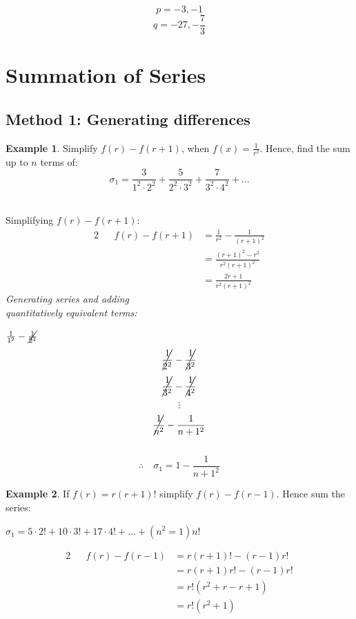 \documentclass[12pt, a4paper]{report}
\theoremstyle{definition}
\newtheorem{example}{Example}
\begin{document}
	\begin{center}
		$$ p = -3,-1 $$
		$$ q= -27, -\dfrac{7}{3}$$
	\end{center}
	\hrulefill
	\newpage
	\section{Summation of Series}
	\subsection{Method 1: Generating differences}
	
	\begin{example}
		Simplify $f(r)-f(r+1)$, when $f(x) = \frac{1}{r^2}$. Hence, find the sum up to $n$ terms of:\\ $$\sigma_1 = \frac{3}{1^2\cdot 2^2} + \frac{5}{2^2\cdot 3^2} + \frac{7}{3^2\cdot 4^2} + \ldots$$
	\end{example}
	~\\
	Simplifying $f(r) - f(r+1)\colon$
	\begin{alignat*}{2}
		&   & f(r)-f(r+1) & = \frac{1}{r^{2}} - \frac{1}{(r+1)^{2}} \\
		&   &             & =\frac{(r+1)^{2}-r^2}{r^2(r+1)^{2}}     \\
		&   &             & =\frac{2r+1}{r^2(r+1)^2}                
	\end{alignat*}
	\textit{Generating series and adding}\\
	\textit{quantitatively equivalent terms:}
	\begin{center}
		$	\frac{1}{1^2} - \cancel{\frac{1}{2^2}}$
		$$	\cancel{\frac{1}{2^2}} - \cancel{\frac{1}{3^2}}$$
		$$	\cancel{\frac{1}{3^2}} - \cancel{\frac{1}{4^2}}$$
		$$\vdots$$
		$$\cancel{\frac{1}{n^2}} - \frac{1}{n+1^2}$$
		~\\
		$$\boxed{\therefore \quad \sigma_1 = 1 - \frac{1}{n+1^2}}$$
	\end{center}
	\hrulefill
	\begin{example}
		If $f(r) = r(r+1)!$ simplify $f(r) - f(r-1)$. Hence sum the series:\\
	\end{example}
	\begin{center}
		$\sigma_1 = 5\cdot 2! + 10\cdot 3! + 17\cdot 4! +  ... + (n^2=1)n!$\\
	\end{center}
	\hrulefill
	\begin{alignat*}{2}
		&   & f(r)-f(r-1) & =r(r+1)! - (r-1)r!  \\
		&   &             & =r(r+1)r! - (r-1)r! \\
		&   &             & =r!(r^2+r-r+1)      \\
		&   &             & =r!(r^2+1)          
	\end{alignat*}
\end{document}
